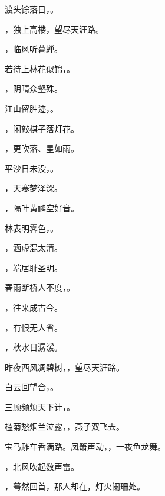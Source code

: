 \documentclass[12pt, a4paper, addpoints]{exam}
\begin{document}
\begin{questions}
\question[2] 渡头馀落日，\uline{\qquad\qquad\qquad\qquad}。

\question[2] \uline{\qquad\qquad\qquad\qquad}，独上高楼，望尽天涯路。

\question[2] \uline{\qquad\qquad\qquad\qquad}，临风听暮蝉。

\question[2] 若待上林花似锦，\uline{\qquad\qquad\qquad\qquad}。

\question[2] \uline{\qquad\qquad\qquad\qquad}，阴晴众壑殊。

\question[2] 江山留胜迹，\uline{\qquad\qquad\qquad\qquad}。

\question[2] \uline{\qquad\qquad\qquad\qquad}，闲敲棋子落灯花。

\question[2] \uline{\qquad\qquad\qquad\qquad}，更吹落、星如雨。

\question[2] 平沙日未没，\uline{\qquad\qquad\qquad\qquad}。

\question[2] \uline{\qquad\qquad\qquad\qquad}，天寒梦泽深。

\question[2] \uline{\qquad\qquad\qquad\qquad}，隔叶黄鹂空好音。

\question[2] 林表明霁色，\uline{\qquad\qquad\qquad\qquad}。

\question[2] \uline{\qquad\qquad\qquad\qquad}，涵虚混太清。

\question[2] \uline{\qquad\qquad\qquad\qquad}，端居耻圣明。

\question[2] 春雨断桥人不度，\uline{\qquad\qquad\qquad\qquad}。

\question[2] \uline{\qquad\qquad\qquad\qquad}，往来成古今。

\question[2] \uline{\qquad\qquad\qquad\qquad}，有恨无人省。

\question[2] \uline{\qquad\qquad\qquad\qquad}，秋水日潺湲。

\question[2] 昨夜西风凋碧树，\uline{\qquad\qquad\qquad\qquad}，望尽天涯路。

\question[2] 白云回望合，\uline{\qquad\qquad\qquad\qquad}。

\question[2] 三顾频烦天下计，\uline{\qquad\qquad\qquad\qquad}。

\question[2] 槛菊愁烟兰泣露，\uline{\qquad\qquad\qquad\qquad}，燕子双飞去。

\question[2] 宝马雕车香满路。凤箫声动，\uline{\qquad\qquad\qquad\qquad}，一夜鱼龙舞。

\question[2] \uline{\qquad\qquad\qquad\qquad}，北风吹起数声雷。

\question[2] \uline{\qquad\qquad\qquad\qquad}，蓦然回首，那人却在，灯火阑珊处。


\end{questions}
\end{document}
